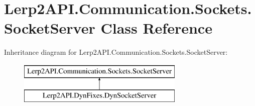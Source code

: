 \hypertarget{class_lerp2_a_p_i_1_1_communication_1_1_sockets_1_1_socket_server}{}\section{Lerp2\+A\+P\+I.\+Communication.\+Sockets.\+Socket\+Server Class Reference}
\label{class_lerp2_a_p_i_1_1_communication_1_1_sockets_1_1_socket_server}
Inheritance diagram for Lerp2\+A\+P\+I.\+Communication.\+Sockets.\+Socket\+Server\+:\begin{figure}[H]
\begin{center}
\leavevmode
\includegraphics[height=2.000000cm]{class_lerp2_a_p_i_1_1_communication_1_1_sockets_1_1_socket_server}
\end{center}
\end{figure}
